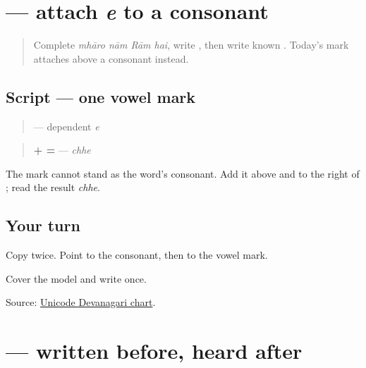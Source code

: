 \section[\texorpdfstring{\mw{े} (e)}{े (e)}]{ — attach \emph{e} to a consonant}

\label{lesson:MW-W07-e-matra}



\begin{quote}
Complete \emph{mhāro nām Rām hai}, write \textbf{}, then write known \textbf{}. Today's mark attaches above a consonant instead.
\end{quote}

\subsection*{Script — one vowel mark}

\begin{quote}
\textbf{} — dependent \emph{e}
\end{quote}

\begin{quote}
\textbf{ +  = } — \emph{chhe}
\end{quote}

The mark cannot stand as the word's consonant. Add it above and to the right of \textbf{}; read the result \emph{chhe}.

\subsection*{Your turn}
Copy \textbf{} twice. Point to the consonant, then to the vowel mark.

\begin{tcolorbox}[breakable,colback=teal!4,colframe=teal!35!black,title={Before you move on}]
Cover the model and write \textbf{} once.

Source: \href{https://www.unicode.org/charts/PDF/U0900.pdf}{Unicode Devanagari chart}.
\end{tcolorbox}
\section[\texorpdfstring{\mw{ि} (i)}{ि (i)}]{ — written before, heard after}

\label{lesson:MW-W07-i-matra}



